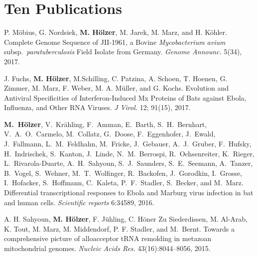 \documentclass[a4paper,10pt]{article} %
\begin{document}
%	
%
\section{\textbf{Ten Publications}}  

\begin{small}

P. Möbius, G. Nordsiek, \textbf{M. Hölzer}, M. Jarek, M. Marz, and H. Köhler.
Complete Genome Sequence of JII-1961, a Bovine \emph{Mycobacterium avium} subsp.\ \emph{paratuberculosis} Field Isolate from Germany.
\emph{Genome Announc.} 5(34), 2017. 

J. Fuchs, \textbf{M. Hölzer}, M.Schilling, C. Patzina, A. Schoen, T. Hoenen, G. Zimmer, M. Marz, F. Weber, M. A. Müller, and G. Kochs.
Evolution and Antiviral Specificities of Interferon-Induced Mx Proteins of Bats against Ebola, Influenza, and Other RNA Viruses.
\emph{J Virol.} 12; 91(15), 2017. 

\textbf{M.~H\"olzer}, V.~Kr\"ahling, F.~Amman, E.~Barth, S.~H.~Bernhart, V.~A.~O.~Carmelo,  M.~Collatz, G.~Doose, F.~Eggenhofer, J.~Ewald, J.~Fallmann, L.~M.~Feldhahn, M.~Fricke, J.~Gebauer, A.~J.~Gruber, F.~Hufsky, H.~Indrischek, S.~Kanton, J.~Linde, N.~M.~Berrospi, R.~Ochsenreiter, K.~Rieger, L.~Rivarola-Duarte, A.~H.~Sahyoun, S.~J.~Saunders, S.~E.~Seemann, A.~Tanzer, B.~Vogel, S.~Wehner, M.~T.~Wolfinger, R.~Backofen, J.~Gorodkin, I.~Grosse, I.~Hofacker, S.~Hoffmann, C.~Kaleta, P.~F.~Stadler, S.~Becker, and M.~Marz.
Differential transcriptional responses to Ebola and Marburg virus infection in bat and human cells.
\emph{Scientific reports} 6:34589, 2016.

A. H. Sahyoun, \textbf{M. Hölzer}, F. Jühling, C. Höner Zu Siederdissen, M. Al-Arab, K. Tout, M. Marz, M. Middendorf, P. F. Stadler, and M.~Bernt. 
Towards a comprehensive picture of alloacceptor {tRNA} remolding in metazoan mitochondrial genomes. 
\emph{Nucleic Acids Res.} 43(16):8044--8056, 2015.

\end{small}





\end{document}
